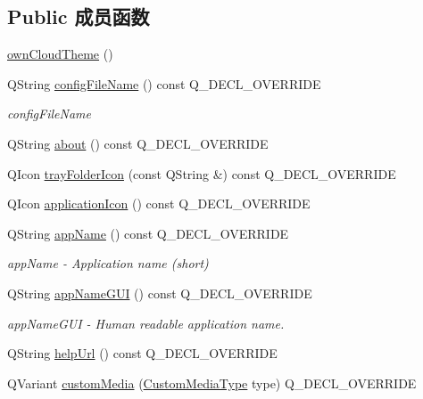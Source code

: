 \subsection*{Public 成员函数}
\begin{DoxyCompactItemize}
\item 
\hyperlink{class_o_c_c_1_1own_cloud_theme_a6ebd5b6458ac1e481d5605b65c0099f0}{own\+Cloud\+Theme} ()
\item 
Q\+String \hyperlink{class_o_c_c_1_1own_cloud_theme_a83b4d95d9bc4fa972ad2e044720beac0}{config\+File\+Name} () const Q\+\_\+\+D\+E\+C\+L\+\_\+\+O\+V\+E\+R\+R\+I\+DE
\begin{DoxyCompactList}\small\item\em config\+File\+Name \end{DoxyCompactList}\item 
Q\+String \hyperlink{class_o_c_c_1_1own_cloud_theme_a421c900cd70e33ade914a2066cb9b55c}{about} () const Q\+\_\+\+D\+E\+C\+L\+\_\+\+O\+V\+E\+R\+R\+I\+DE
\item 
Q\+Icon \hyperlink{class_o_c_c_1_1own_cloud_theme_a1f64a30c0d6ecb85fb009a3d776b50c1}{tray\+Folder\+Icon} (const Q\+String \&) const Q\+\_\+\+D\+E\+C\+L\+\_\+\+O\+V\+E\+R\+R\+I\+DE
\item 
Q\+Icon \hyperlink{class_o_c_c_1_1own_cloud_theme_a45975f531c5c2c1f7e699f53d55d786e}{application\+Icon} () const Q\+\_\+\+D\+E\+C\+L\+\_\+\+O\+V\+E\+R\+R\+I\+DE
\item 
Q\+String \hyperlink{class_o_c_c_1_1own_cloud_theme_a96f74e2ad1c65799f9bd3955cc4c50ee}{app\+Name} () const Q\+\_\+\+D\+E\+C\+L\+\_\+\+O\+V\+E\+R\+R\+I\+DE
\begin{DoxyCompactList}\small\item\em app\+Name -\/ Application name (short) \end{DoxyCompactList}\item 
Q\+String \hyperlink{class_o_c_c_1_1own_cloud_theme_ae4d6581e7332b009cfd6445bd23a9b95}{app\+Name\+G\+UI} () const Q\+\_\+\+D\+E\+C\+L\+\_\+\+O\+V\+E\+R\+R\+I\+DE
\begin{DoxyCompactList}\small\item\em app\+Name\+G\+UI -\/ Human readable application name. \end{DoxyCompactList}\item 
Q\+String \hyperlink{class_o_c_c_1_1own_cloud_theme_a30a50cd11d5c7a354ef47412741d96e4}{help\+Url} () const Q\+\_\+\+D\+E\+C\+L\+\_\+\+O\+V\+E\+R\+R\+I\+DE
\item 
Q\+Variant \hyperlink{class_o_c_c_1_1own_cloud_theme_aa920f64294310b68e6ea50e1c2ec0d0b}{custom\+Media} (\hyperlink{class_o_c_c_1_1_theme_a7d36668d1fd0d715e4e1d8f4590d2d5d}{Custom\+Media\+Type} type) Q\+\_\+\+D\+E\+C\+L\+\_\+\+O\+V\+E\+R\+R\+I\+DE

\end{DoxyCompactItemize}

